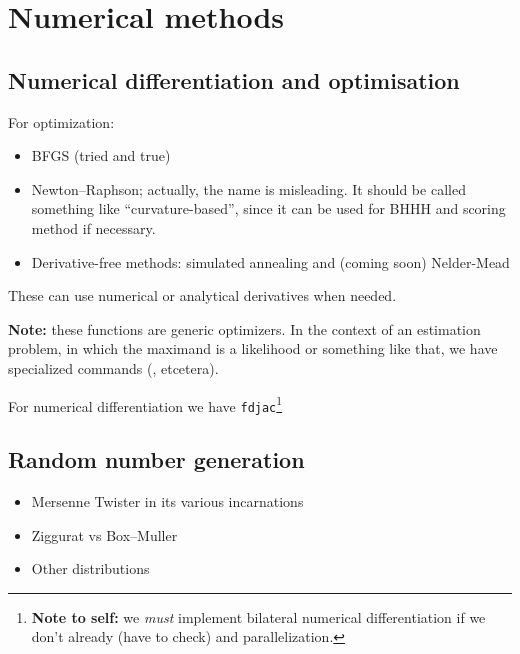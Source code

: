 



\chapter{Numerical methods}

\section{Numerical differentiation and optimisation}

For optimization:
\begin{itemize}
\item BFGS (tried and true)
\item Newton--Raphson; actually, the name is misleading. It should be
  called something like ``curvature-based'', since it can be used for
  BHHH and scoring method if necessary.
\item Derivative-free methods: simulated annealing and (coming soon)
  Nelder-Mead
\end{itemize}

These can use numerical or analytical derivatives when needed.

\textbf{Note:} these functions are generic optimizers. In the context
of an estimation problem, in which the maximand is a likelihood or
something like that, we have specialized commands (,
 etcetera).

For numerical differentiation we have
\texttt{fdjac}\footnote{\textbf{Note to self:} we \emph{must}
  implement bilateral numerical differentiation if we don't already
  (have to check) and parallelization.}


\section{Random number generation}

\begin{itemize}
\item Mersenne Twister in its various incarnations
\item Ziggurat vs Box--Muller
\item Other distributions
\end{itemize}

